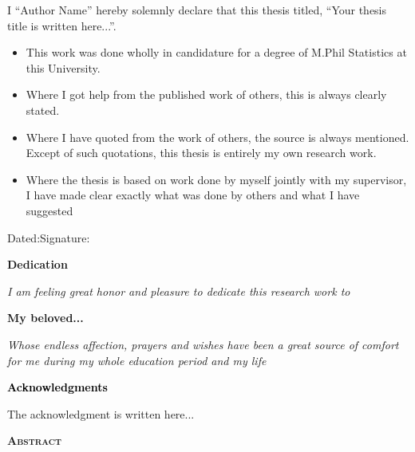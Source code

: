 \documentclass[12pt,a4paper]{report}
\begin{document}
I \enquote{Author Name} hereby solemnly declare that this thesis titled, \enquote{Your thesis title is written here...}. 

\begin{itemize}
\item This work was done wholly in candidature for a degree of M.Phil Statistics at this University.
\item Where I got help from the published work of others, this is always clearly stated.
\item  Where I have quoted from the work of others, the source is always mentioned. Except of such quotations, this thesis is entirely my own research work.
\item Where the thesis is based on work done by myself jointly with my supervisor, I have
made clear exactly what was done by others and what I have suggested
\end{itemize}
\vspace{1cm}
\begin{center}			Dated:\hrulefill\quad\quad\quad\quad\quad\quad Signature:\hrulefill
\end{center}	\newpage

\newpage
\vspace*{2.2 cm}
\Large
\noindent

\begin{center}
\textbf{\huge Dedication}
\end{center}
\vspace*{0.1 cm}
\normalsize
\noindent
\begin{center}
\textit{I am feeling great honor and pleasure to dedicate this research work to}
\end{center}
\begin{center}
{\bf My beloved...}
\end{center}	
\begin{center}
\textit{Whose endless affection, prayers and wishes have been a great source of comfort for me during my whole education period and my life}
\end{center}
\vspace{1cm}
\newpage
\normalsize

\begin{center}
\textcolor{black}{\textbf{{\huge Acknowledgments}}} 
\end{center}

The acknowledgment is written here...


\newpage

\newpage
\huge
\begin{center}
{\huge \textbf{\textsc{Abstract}}}
\end{center}  
\normalsize
\end{document}
